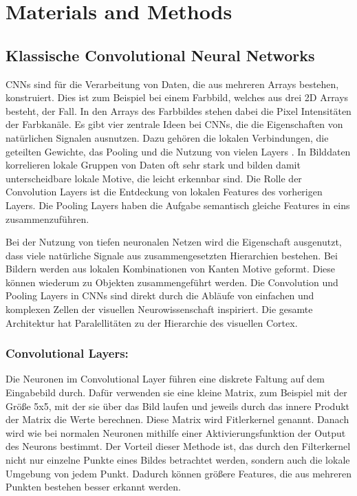 \documentclass[runningheads,a4paper]{llncs}[2015/06/24]
\begin{document}
\section{Materials and Methods}\label{sec:material}

\subsection{Klassische Convolutional Neural Networks}
CNNs sind für die Verarbeitung von Daten, die aus mehreren Arrays bestehen, konstruiert. Dies ist zum Beispiel bei einem Farbbild, welches aus drei 2D Arrays besteht, der Fall. In den Arrays des Farbbildes stehen dabei die Pixel Intensitäten der Farbkanäle. Es gibt vier zentrale Ideen bei CNNs, die die Eigenschaften von natürlichen Signalen ausnutzen. Dazu gehören die lokalen Verbindungen, die geteilten Gewichte, das Pooling und die Nutzung von vielen Layers \cite{lecun_nature}. In Bilddaten korrelieren lokale Gruppen von Daten oft sehr stark und bilden damit unterscheidbare lokale Motive, die leicht erkennbar sind. Die Rolle der Convolution Layers ist die Entdeckung von lokalen Features des vorherigen Layers. Die Pooling Layers haben die Aufgabe semantisch gleiche Features in eins zusammenzuführen.

Bei der Nutzung von tiefen neuronalen Netzen wird die Eigenschaft ausgenutzt, dass viele natürliche Signale aus zusammengesetzten Hierarchien bestehen. Bei Bildern werden aus lokalen Kombinationen von Kanten Motive geformt. Diese können wiederum zu Objekten zusammengeführt werden. Die Convolution und Pooling Layers in CNNs sind direkt durch die Abläufe von einfachen und komplexen Zellen der visuellen Neurowissenschaft inspiriert. Die gesamte Architektur hat Paralellitäten zu der Hierarchie des visuellen Cortex. 

\subsubsection*{Convolutional Layers:}
Die Neuronen im Convolutional Layer führen eine diskrete Faltung auf dem Eingabebild durch. Dafür verwenden sie eine kleine Matrix, zum Beispiel mit der Größe 5x5, mit der sie über das Bild laufen und jeweils durch das innere Produkt der Matrix die Werte berechnen. Diese Matrix wird Fitlerkernel genannt. Danach wird wie bei normalen Neuronen mithilfe einer Aktivierungsfunktion der Output des Neurons bestimmt. Der Vorteil dieser Methode ist, das durch den Filterkernel nicht nur einzelne Punkte eines Bildes betrachtet werden, sondern auch die lokale Umgebung von jedem Punkt. Dadurch können größere Features, die aus mehreren Punkten bestehen besser erkannt werden.
\end{document}
